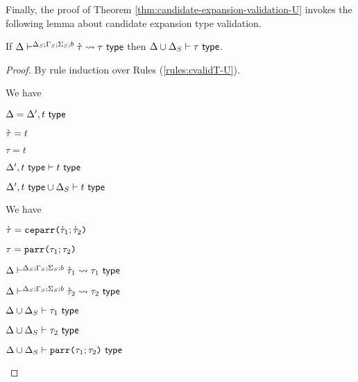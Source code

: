 Finally, the proof of Theorem \ref{thm:candidate-expansion-validation-U} invokes the following lemma about candidate expansion type validation.
\begin{lemma}\label{lemma:candidate-expansion-type-validation}
If $\Delta\vdash^{\Delta_S; \Gamma_S; \Sigma_S; b} \grave{\tau} \leadsto \tau~\mathsf{type}$ then $\Delta \cup \Delta_S \vdash \tau~\mathsf{type}$.
\end{lemma}
\begin{proof} By rule induction over Rules (\ref{rules:cvalidT-U}).
\begin{byCases}
\item[\text{(\ref{rule:cvalidT-U-tvar})}] We have 
\begin{pfsteps*}
   \item $\Delta=\Delta', t~\mathsf{type}$ 
   \item $\grave{\tau}=t$ 
   \item $\tau=t$ 
   \item $\Delta', t~\mathsf{type} \vdash t~\mathsf{type}$  
   \item $\Delta', t~\mathsf{type} \cup \Delta_S \vdash t~\mathsf{type}$ 
 \end{pfsteps*} 
\resetpfcounter

\item[\text{(\ref{rule:cvalidT-U-parr})}] We have
\begin{pfsteps*}
  \item $\grave{\tau}=\texttt{ceparr}\texttt{(}\grave{\tau}_1; \grave{\tau}_2\texttt{)}$ 
  \item $\tau=\texttt{parr}\texttt{(}\tau_1; \tau_2\texttt{)}$ 
  \item $\Delta\vdash^{\Delta_S; \Gamma_S; \Sigma_S; b} \grave{\tau}_1 \leadsto \tau_1~\mathsf{type}$  
  \item $\Delta\vdash^{\Delta_S; \Gamma_S; \Sigma_S; b} \grave{\tau}_2 \leadsto \tau_2~\mathsf{type}$  
  \item $\Delta \cup \Delta_S \vdash \tau_1~\mathsf{type}$  
  \item $\Delta \cup \Delta_S \vdash \tau_2~\mathsf{type}$  
  \item $\Delta \cup \Delta_S \vdash \texttt{parr}\texttt{(}\tau_1; \tau_2\texttt{)}~\mathsf{type}$ 
\end{pfsteps*}
\resetpfcounter


\end{byCases}
\end{proof}
